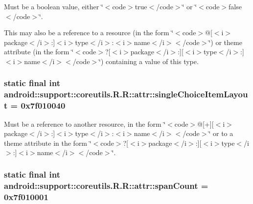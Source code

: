 Must be a boolean value, either \char`\"{}$<$code$>$true$<$/code$>$\char`\"{} or \char`\"{}$<$code$>$false$<$/code$>$\char`\"{}. 

This may also be a reference to a resource (in the form \char`\"{}$<$code$>$@\mbox{[}$<$i$>$package$<$/i$>$:\mbox{]}$<$i$>$type$<$/i$>$:$<$i$>$name$<$/i$>$$<$/code$>$\char`\"{}) or theme attribute (in the form \char`\"{}$<$code$>$?\mbox{[}$<$i$>$package$<$/i$>$:\mbox{]}\mbox{[}$<$i$>$type$<$/i$>$:\mbox{]}$<$i$>$name$<$/i$>$$<$/code$>$\char`\"{}) containing a value of this type. \hypertarget{classandroid_1_1support_1_1coreutils_1_1_r_1_1attr_68c35e6a181ad9a28ed21f0421c24071}{
\subsubsection[{singleChoiceItemLayout}]{\setlength{\rightskip}{0pt plus 5cm}static final int android::support::coreutils.R.R::attr::singleChoiceItemLayout = 0x7f010040}}
\label{classandroid_1_1support_1_1coreutils_1_1_r_1_1attr_68c35e6a181ad9a28ed21f0421c24071}


Must be a reference to another resource, in the form \char`\"{}$<$code$>$@\mbox{[}+\mbox{]}\mbox{[}$<$i$>$package$<$/i$>$:\mbox{]}$<$i$>$type$<$/i$>$:$<$i$>$name$<$/i$>$$<$/code$>$\char`\"{} or to a theme attribute in the form \char`\"{}$<$code$>$?\mbox{[}$<$i$>$package$<$/i$>$:\mbox{]}\mbox{[}$<$i$>$type$<$/i$>$:\mbox{]}$<$i$>$name$<$/i$>$$<$/code$>$\char`\"{}. \hypertarget{classandroid_1_1support_1_1coreutils_1_1_r_1_1attr_3cebbb0d000adb605f871a44d6b494bf}{
\subsubsection[{spanCount}]{\setlength{\rightskip}{0pt plus 5cm}static final int android::support::coreutils.R.R::attr::spanCount = 0x7f010001}}
\label{classandroid_1_1support_1_1coreutils_1_1_r_1_1attr_3cebbb0d000adb605f871a44d6b494bf}


